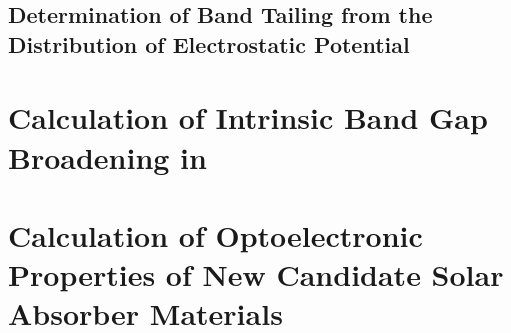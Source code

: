\subsection{Determination of Band Tailing from the Distribution of Electrostatic Potential}


\section{Calculation of Intrinsic Band Gap Broadening in \CZTS}


\section{Calculation of Optoelectronic Properties of New Candidate Solar Absorber Materials}

                            